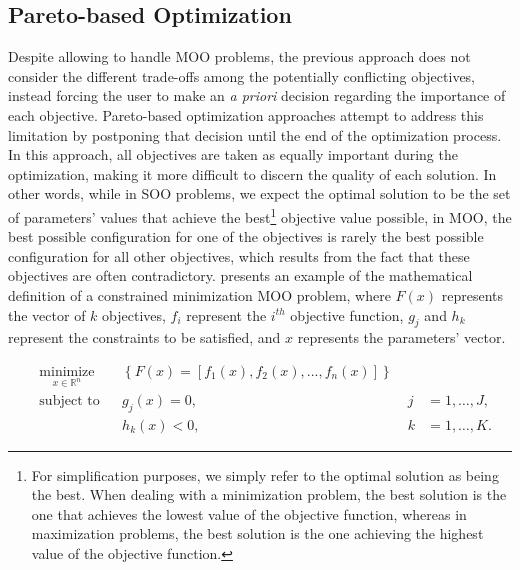 	\subsection{Pareto-based Optimization}
	\label{ssec:pareto}
	
	Despite allowing to handle \ac{MOO} problems, the previous approach does not consider the different trade-offs among the potentially conflicting objectives, instead forcing the user to make an \textit{a priori} decision regarding the importance of each objective. Pareto-based optimization approaches attempt to address this limitation by postponing that decision until the end of the optimization process. In this approach, all objectives are taken as equally important during the optimization, making it more difficult to discern the quality of each solution. In other words, while in \ac{SOO} problems, we expect the optimal solution to be the set of parameters' values that achieve the best\footnote{For simplification purposes, we simply refer to the optimal solution as being the best. When dealing with a minimization problem, the best solution is the one that achieves the lowest value of the objective function, whereas in maximization problems, the best solution is the one achieving the highest value of the objective function.} objective value possible, in \ac{MOO}, the best possible configuration for one of the objectives is rarely the best possible configuration for all other objectives, which results from the fact that these objectives are often contradictory.  presents an example of the mathematical definition of a constrained minimization \ac{MOO} problem, where $F(x)$ represents the vector of $k$ objectives, $f_i$ represent the $i^{th}$ objective function, $g_j$ and $h_k$ represent the constraints to be satisfied, and $x$ represents the parameters' vector.
	
	
	\begin{equation} \label{eq:pareto-based}
	\begin{aligned}
	& \underset{x \in \mathbb{R}^n}{\text{minimize}}
	& & \left\lbrace F(x) = \left[f_1(x), f_2(x), ..., f_n(x)\right]  \right\rbrace \\
	& \text{subject to}
	& & g_j(x) = 0, & \; j &= 1, \ldots, J, \\ 
	&&& h_k(x) < 0, & \; k &= 1, \ldots, K.
	\end{aligned}
	\end{equation}
	

